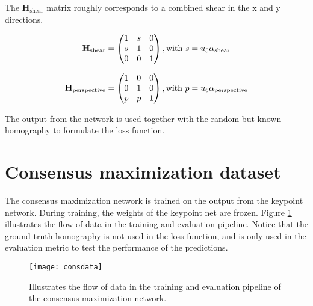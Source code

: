 The $\textbf{H}_{\mathrm{shear}}$ matrix roughly corresponds to a combined shear in the x and y directions.

\begin{equation}
\textbf{H}_{\mathrm{shear}} = 
\begin{pmatrix}
1 & s & 0 \\
s & 1 & 0 \\
0 & 0 & 1 \\
\end{pmatrix}
, \text{with}
\ s=u_5 \alpha_{\mathrm{shear}} \\
\end{equation}

\begin{equation}
\textbf{H}_{\mathrm{perspective}} = 
\begin{pmatrix}
1 & 0 & 0 \\
0 & 1 & 0 \\
p & p & 1 \\
\end{pmatrix}
, \text{with}
\ p=u_6\alpha_{\mathrm{perspective}} \\
\end{equation}

The output from the network is used together with the random but known homography to formulate the loss function.

\section{Consensus maximization dataset}

The consensus maximization network is trained on the output from the keypoint network. During training, the weights of the keypoint net are frozen. Figure \ref{fig:consdata} illustrates the flow of data in the training and evaluation pipeline. Notice that the ground truth homography is not used in the loss function, and is only used in the evaluation metric to test the performance of the predictions.

\begin{figure}[H]
	\centering
	\texttt{[image: consdata]}
	\caption{Illustrates the flow of data in the training and evaluation pipeline of the consensus maximization network.}
	\label{fig:consdata}
\end{figure}
